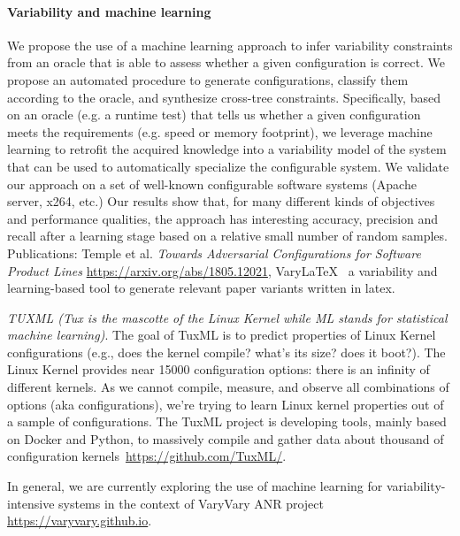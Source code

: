 \paragraph{Variability and machine learning}
We propose the use of a machine learning approach to infer variability constraints
from an oracle that is able to assess whether a given configuration is correct.
We propose an automated procedure to generate configurations, classify them according to the oracle, and synthesize cross-tree constraints. Specifically, based on an oracle (e.g. a runtime test) that tells us whether a given configuration meets the requirements (e.g. speed or memory footprint), we leverage machine learning to retrofit the acquired knowledge into a variability model of the system that can be used to automatically specialize the configurable system. We validate our approach on a set of well-known configurable software systems (Apache server, x264, etc.) 
Our results show that, for many different kinds of objectives and performance qualities, the approach has interesting accuracy, precision and recall after a learning stage based on a relative small number of random samples.
Publications: Temple et al. \emph{Towards Adversarial Configurations for Software Product Lines} \url{https://arxiv.org/abs/1805.12021}, VaryLaTeX~\cite{acher:hal-01659161} a variability and learning-based tool to generate relevant paper variants written in latex. 

\emph{TUXML (Tux is the mascotte of the Linux Kernel while ML stands for statistical machine learning)}. The goal of TuxML  is to predict properties of Linux Kernel configurations (e.g., does the kernel compile? what's its size? does it boot?). The Linux Kernel provides near 15000 configuration options: there is an infinity of different kernels. As we cannot compile, measure, and observe all combinations of options (aka configurations), we're trying to learn Linux kernel properties out of a sample of configurations. The TuxML project is developing tools, mainly based on Docker and Python, to massively compile and gather data about thousand of configuration kernels~\url{https://github.com/TuxML/}.

In general, we are currently exploring the use of machine learning for variability-intensive systems in the context of VaryVary ANR project \url{https://varyvary.github.io}.



